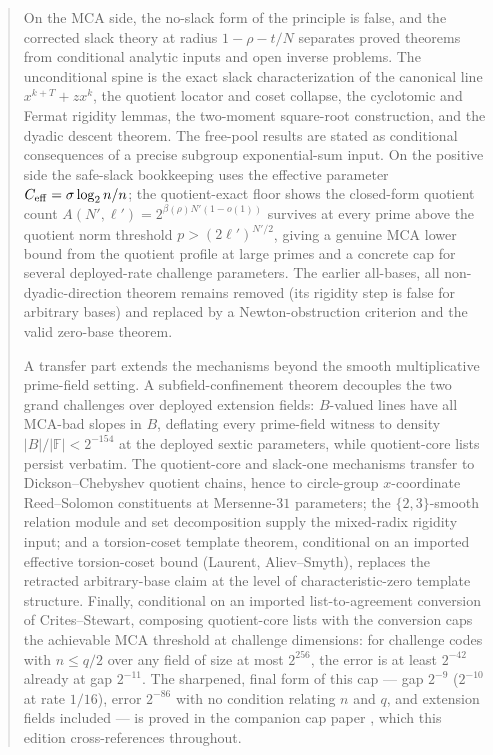 \documentclass[11pt]{article}
\theoremstyle{definition}
\newcommand{\F}{\mathbb F}
\newcommand{\ceff}{C_{\rm eff}}
\begin{document}
\begin{abstract}
On the MCA side, the no-slack form of the principle is false, and the corrected slack theory at radius $1-\rho-t/N$ separates proved theorems from conditional analytic inputs and open inverse problems.  The unconditional spine is the exact slack characterization of the canonical line $x^{k+T}+zx^k$, the quotient locator and coset collapse, the cyclotomic and Fermat rigidity lemmas, the two-moment square-root construction, and the dyadic descent theorem.  The free-pool results are stated as conditional consequences of a precise subgroup exponential-sum input.  On the positive side the safe-slack bookkeeping uses the effective parameter $\ceff=\sigma\log_2 n/n$; the quotient-exact floor shows the closed-form quotient count $A(N',\ell')=2^{\beta(\rho)N'(1-o(1))}$ survives at every prime above the quotient norm threshold $p>(2\ell')^{N'/2}$, giving a genuine MCA lower bound from the quotient profile at large primes and a concrete cap for several deployed-rate challenge parameters.  The earlier all-bases, all non-dyadic-direction theorem remains removed (its rigidity step is false for arbitrary bases) and replaced by a Newton-obstruction criterion and the valid zero-base theorem.

A transfer part extends the mechanisms beyond the smooth multiplicative prime-field setting.  A subfield-confinement theorem decouples the two grand challenges over deployed extension fields: $B$-valued lines have all MCA-bad slopes in $B$, deflating every prime-field witness to density $|B|/|\F|<2^{-154}$ at the deployed sextic parameters, while quotient-core lists persist verbatim.  The quotient-core and slack-one mechanisms transfer to Dickson--Chebyshev quotient chains, hence to circle-group $x$-coordinate Reed--Solomon constituents at Mersenne-$31$ parameters; the $\{2,3\}$-smooth relation module and set decomposition supply the mixed-radix rigidity input; and a torsion-coset template theorem, conditional on an imported effective torsion-coset bound (Laurent, Aliev--Smyth), replaces the retracted arbitrary-base claim at the level of characteristic-zero template structure.  Finally, conditional on an imported list-to-agreement conversion of Crites--Stewart, composing quotient-core lists with the conversion caps the achievable MCA threshold at challenge dimensions: for challenge codes with $n\le q/2$ over any field of size at most $2^{256}$, the error is at least $2^{-42}$ already at gap $2^{-11}$.  The sharpened, final form of this cap --- gap $2^{-9}$ ($2^{-10}$ at rate $1/16$), error $2^{-86}$ with no condition relating $n$ and $q$, and extension fields included --- is proved in the companion cap paper \cite{UniversalCap}, which this edition cross-references throughout.


\end{abstract}
\end{document}
